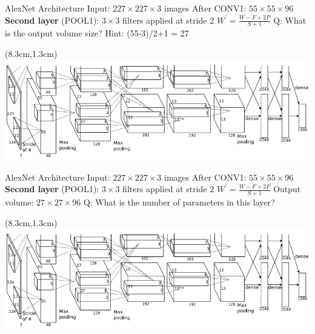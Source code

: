 \documentclass[serif, aspectratio=169]{beamer}
\begin{document}
\begin{frame}{AlexNet Architecture}
	\vspace{1cm}
	Input: $227 \times 227 \times 3$ images \newline 
	After CONV1: $55 \times 55 \times 96$ \vspace{0.3cm} \newline
	\textbf{Second layer} (POOL1): $3 \times 3$ filters applied at stride 2 \hspace{2cm} $W^{\prime} = \frac{W - F + 2P}{S + 1}$ \newline 
	\color{blue} Q: What is the output volume size? Hint: (55-3)/2+1 = 27
	
	\begin{textblock*}{5cm}(8.3cm,1.3cm) %
		\includegraphics[keepaspectratio, scale=0.25]{pic/alexnet}
	\end{textblock*}
\end{frame}

\begin{frame}{AlexNet Architecture}
	\vspace{1cm}
	Input: $227 \times 227 \times 3$ images \newline 
	After CONV1: $55 \times 55 \times 96$ \vspace{0.3cm} \newline
	\textbf{Second layer} (POOL1): $3 \times 3$ filters applied at stride 2 
	\hspace{2cm} $W^{\prime} = \frac{W - F + 2P}{S + 1}$ \newline 
	Output volume: $27 \times 27 \times 96$ \vspace{0.3cm} \newline
	\color{blue} Q: What is the number of parameters in this layer?
	
	\begin{textblock*}{5cm}(8.3cm,1.3cm) %
		\includegraphics[keepaspectratio, scale=0.25]{pic/alexnet}
	\end{textblock*}
\end{frame}
\end{document}
